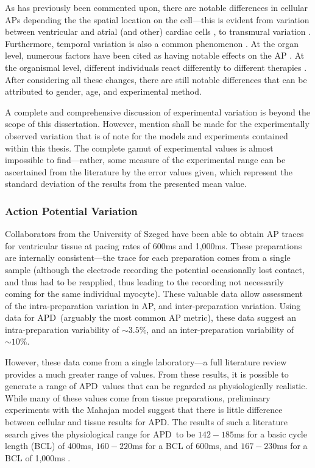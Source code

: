 \documentclass[../thesis-main.tex]{subfiles}
\begin{document}
 As has previously been commented upon, there are notable differences in cellular APs depending the the spatial location on the cell---this is evident from variation between ventricular and atrial (and other) cardiac cells \citep{Carmeliet2002}, to transmural variation \citep{Antzelevitch1991}. Furthermore, temporal variation is also a common phenomenon \citep{Walmsley2010}. At the organ level, numerous factors have been cited as having notable effects on the AP \citep{Taylor1997}. At the organismal level, different individuals react differently to different therapies \citep{Kannankeril2010}. After considering all these changes, there are still notable differences that can be attributed to gender, age, and experimental method.
 
 A complete and comprehensive discussion of experimental variation is beyond the scope of this dissertation. However, mention shall be made for the experimentally observed variation that is of note for the models and experiments contained within this thesis. The complete gamut of experimental values is almost impossible to find---rather, some measure of the experimental range can be ascertained from the literature by the error values given, which represent the standard deviation of the results from the presented mean value.
 
 \subsubsection{Action Potential Variation}
 \label{subsubsec:ap-variation}
 Collaborators from the University of Szeged have been able to obtain AP traces for ventricular tissue at pacing rates of 600ms and 1,000ms. These preparations are internally consistent---the trace for each preparation comes from a single sample (although the electrode recording the potential occasionally lost contact, and thus had to be reapplied, thus leading to the recording not necessarily coming for the same individual myocyte). These valuable data allow assessment of the intra-preparation variation in AP, and inter-preparation variation. Using data for APD~(arguably the most common AP metric), these data suggest an intra-preparation variability of $\sim3.5\%$, and an inter-preparation variability of $\sim10\%$.
 
 However, these data come from a single laboratory---a full literature review provides a much greater range of values. From these results, it is possible to generate a range of APD~values that can be regarded as physiologically realistic. While many of these values come from tissue preparations, preliminary experiments with the Mahajan model suggest that there is little difference between cellular and tissue results for APD. The results of such a literature search gives the physiological range for APD~to be $142-185$ms for a basic cycle length (BCL) of 400ms, $160-220$ms for a BCL of 600ms, and $167-230$ms for a BCL of 1,000ms \citep{Biagetti2006, Szigligeti1996, Yan2001, Jung2011, Goldhaber2005, Wu2011, Chen2006, Kirchhof2003, Eckardt1998, Zabel1997, Zabel1997a, Kurz1993, McIntosh2000}.
 
\end{document}
